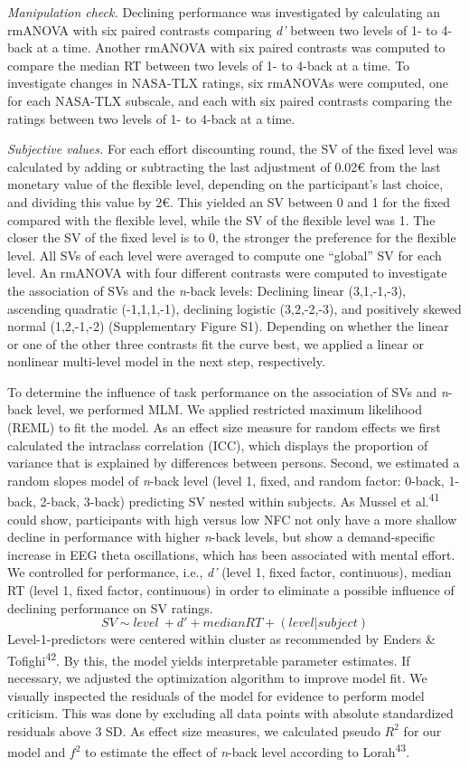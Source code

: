 \documentclass[
  man,floatsintext]{apa6}
\begin{document}
\emph{Manipulation check.}
Declining performance was investigated by calculating an rmANOVA with six paired contrasts comparing \emph{d'} between two levels of 1- to 4-back at a time.
Another rmANOVA with six paired contrasts was computed to compare the median RT between two levels of 1- to 4-back at a time.
To investigate changes in NASA-TLX ratings, six rmANOVAs were computed, one for each NASA-TLX subscale, and each with six paired contrasts comparing the ratings between two levels of 1- to 4-back at a time.

\emph{Subjective values.}
For each effort discounting round, the SV of the fixed level was calculated by adding or subtracting the last adjustment of 0.02€ from the last monetary value of the flexible level, depending on the participant's last choice, and dividing this value by 2€.
This yielded an SV between 0 and 1 for the fixed compared with the flexible level, while the SV of the flexible level was 1.
The closer the SV of the fixed level is to 0, the stronger the preference for the flexible level.
All SVs of each level were averaged to compute one ``global'' SV for each level.
An rmANOVA with four different contrasts were computed to investigate the association of SVs and the \emph{n}-back levels: Declining linear (3,1,-1,-3), ascending quadratic (-1,1,1,-1), declining logistic (3,2,-2,-3), and positively skewed normal (1,2,-1,-2) (Supplementary Figure S1).
Depending on whether the linear or one of the other three contrasts fit the curve best, we applied a linear or nonlinear multi-level model in the next step, respectively.

To determine the influence of task performance on the association of SVs and \emph{n}-back level, we performed MLM.
We applied restricted maximum likelihood (REML) to fit the model.
As an effect size measure for random effects we first calculated the intraclass correlation (ICC), which displays the proportion of variance that is explained by differences between persons.
Second, we estimated a random slopes model of \emph{n}-back level (level 1, fixed, and random factor: 0-back, 1-back, 2-back, 3-back) predicting SV nested within subjects.
As Mussel et al.\textsuperscript{41} could show, participants with high versus low NFC not only have a more shallow decline in performance with higher \emph{n}-back levels, but show a demand-specific increase in EEG theta oscillations, which has been associated with mental effort.
We controlled for performance, i.e., \emph{d'} (level 1, fixed factor, continuous), median RT (level 1, fixed factor, continuous) in order to eliminate a possible influence of declining performance on SV ratings.
\[
SV \sim level\ + d' + median RT + (level|subject)
\]
Level-1-predictors were centered within cluster as recommended by Enders \& Tofighi\textsuperscript{42}.
By this, the model yields interpretable parameter estimates.
If necessary, we adjusted the optimization algorithm to improve model fit.
We visually inspected the residuals of the model for evidence to perform model criticism.
This was done by excluding all data points with absolute standardized residuals above 3 SD.
As effect size measures, we calculated pseudo \(R^{2}\) for our model and \(f^{2}\) to estimate the effect of \emph{n}-back level according to Lorah\textsuperscript{43}.
\end{document}
